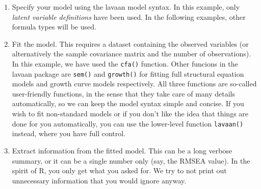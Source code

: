 \begin{enumerate}
\def\labelenumi{\arabic{enumi}.}
\item
  Specify your model using the lavaan model syntax. In this example,
  only \emph{latent variable definitions} have been used. In the
  following examples, other formula types will be used.
\item
  Fit the model. This requires a dataset containing the observed
  variables (or alternatively the sample covariance matrix and the
  number of observations). In this example, we have used the
  \texttt{cfa()} function. Other funcions in the lavaan package are
  \texttt{sem()} and \texttt{growth()} for fitting full structural
  equation models and growth curve models respectively. All three
  functions are so-called user-friendly functions, in the sense that
  they take care of many details automatically, so we can keep the model
  syntax simple and concise. If you wish to fit non-standard models or
  if you don't like the idea that things are done for you automatically,
  you can use the lower-level function \texttt{lavaan()} instead, where
  you have full control.
\item
  Extract information from the fitted model. This can be a long verbose
  summary, or it can be a single number only (say, the RMSEA value). In
  the spirit of R, you only get what you asked for. We try to not print
  out unnecessary information that you would ignore anyway.
\end{enumerate}
